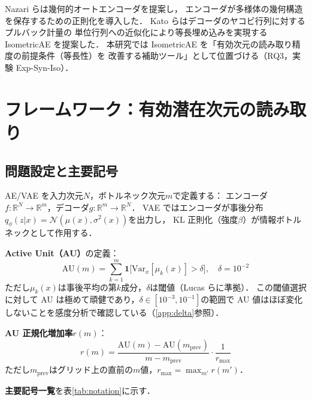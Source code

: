 \documentclass[11pt,a4paper]{jsarticle}
\newcommand{\R}{\mathbb{R}}
\begin{document}
Nazari ら\cite{nazari2023geometric}は幾何的オートエンコーダを提案し，
エンコーダが多様体の幾何構造を保存するための正則化を導入した．
Kato ら\cite{kato2020rdae}はデコーダのヤコビ行列に対するプルバック計量の
単位行列への近似化により等長埋め込みを実現する IsometricAE を提案した．
本研究では IsometricAE を「有効次元の読み取り精度の前提条件（等長性）を
改善する補助ツール」として位置づける（RQ3，実験 Exp-Syn-Iso）．

\section{フレームワーク：有効潜在次元の読み取り}\label{sec:framework}

\subsection{問題設定と主要記号}\label{sec:framework_setup}

AE/VAE を入力次元$N$，ボトルネック次元$m$で定義する：
エンコーダ$f: \R^N \to \R^m$，デコーダ$g: \R^m \to \R^N$．
VAE ではエンコーダが事後分布$q_\phi(z|x) = \mathcal{N}(\mu(x), \sigma^2(x))$を出力し，
KL 正則化（強度$\beta$）が情報ボトルネックとして作用する．

\textbf{Active Unit（AU）}の定義：
\begin{equation}
  \mathrm{AU}(m) = \sum_{k=1}^{m} \mathbf{1}\bigl[\mathrm{Var}_x[\mu_k(x)] > \delta\bigr],
  \quad \delta = 10^{-2}
  \label{eq:au_def}
\end{equation}
ただし$\mu_k(x)$は事後平均の第$k$成分，$\delta$は閾値（Lucas ら\cite{lucas2019elbo}に準拠）．
この閾値選択に対して AU は極めて頑健であり，$\delta \in [10^{-3}, 10^{-1}]$の範囲で AU 値はほぼ変化しないことを感度分析で確認している（\ref{app:delta}参照）．

\textbf{AU 正規化増加率}$r(m)$：
\begin{equation}
  r(m) = \frac{\mathrm{AU}(m) - \mathrm{AU}(m_{\mathrm{prev}})}{m - m_{\mathrm{prev}}} \cdot \frac{1}{r_{\max}}
  \label{eq:au_rate}
\end{equation}
ただし$m_{\mathrm{prev}}$はグリッド上の直前の$m$値，$r_{\max} = \max_{m'} r(m')$．

\textbf{主要記号一覧}を表\ref{tab:notation}に示す．
\end{document}
